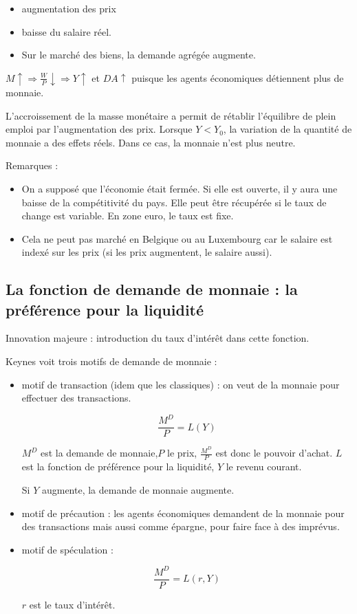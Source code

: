 	\begin{itemize}
		\item augmentation des prix
		\item baisse du salaire réel.
		\item Sur le marché des biens, la demande agrégée augmente.
	\end{itemize}
	
	$M \uparrow \Rightarrow \frac{W}{P} \downarrow \Rightarrow Y \uparrow$ et $DA \uparrow$ puisque les agents économiques détiennent plus de monnaie.
	
	L'accroissement de la masse monétaire a permit de rétablir l'équilibre de plein emploi par l'augmentation des prix. Lorsque $Y < Y_0$, la variation de la quantité de monnaie a des effets réels. Dans ce cas, la monnaie n'est plus neutre.
	
	Remarques :
	
	\begin{itemize}
		\item On a supposé que l'économie était fermée. Si elle est ouverte, il y aura une baisse de la compétitivité du pays. Elle peut être récupérée si le taux de change est variable. En zone euro, le taux est fixe.
		\item Cela ne peut pas marché en Belgique ou au Luxembourg car le salaire est indexé sur les prix (si les prix augmentent, le salaire aussi).
	\end{itemize}
	
	\subsection{La fonction de demande de monnaie : la préférence pour la liquidité}
	
	Innovation majeure : introduction du taux d'intérêt dans cette fonction.
	
	Keynes voit trois motifs de demande de monnaie :
	
	\begin{itemize}
		\item motif de transaction (idem que les classiques) : on veut de la monnaie pour effectuer des transactions.
		
		$$\frac{M^D}{P} = L(Y)$$
		
		$M^D$ est la demande de monnaie,$P$ le prix, $\frac{M^D}{P}$ est donc le pouvoir d'achat. $L$ est la fonction de préférence pour la liquidité, $Y$ le revenu courant.
		
		Si $Y$ augmente, la demande de monnaie augmente.
		
		\item motif de précaution : les agents économiques demandent de la monnaie pour des transactions mais aussi comme épargne, pour faire face à des imprévus.
		
		\item motif de spéculation : 
		
		$$\frac{M^D}{P} = L(r, Y)$$
		
		$r$ est le taux d'intérêt.
	\end{itemize}
	
